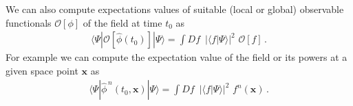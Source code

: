 \documentclass[../QFT_main.tex]{subfiles}
\begin{document}
\begin{mytheorem}
We can also compute expectations values of suitable (local or global) observable functionals $\mathcal{O}[\phi]$ of the field at time $t_0$ as
\begin{align}
    \langle \Psi | \mathcal{O}[\hat{\phi}(t_0)] | \Psi \rangle
    = \int \!Df \,\,\, |\langle f | \Psi \rangle|^2 \,\, \mathcal{O}[f]\,.
\end{align}
%
For example we can compute the expectation value of the field or its powers at a given space point $\mathbf{x}$ as
\begin{align}
    \langle \Psi | \hat{\phi}^{\,n}(t_0, \mathbf{x}) | \Psi \rangle
    = \int \!Df \,\,\, |\langle f | \Psi \rangle|^2 \,\, f^n(\mathbf{x})\,.
\end{align}
%
\end{mytheorem}
\end{document}
